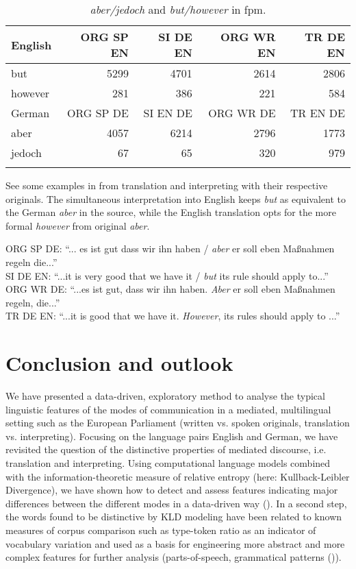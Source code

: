 \documentclass[output=paper,colorlinks,citecolor=brown]{langscibook}
\begin{document}
\begin{table}
\begin{tabular}{lrrrr}
\lsptoprule
English & ORG SP EN & SI DE EN & ORG WR EN & TR DE EN \\\midrule
but & 5299 & 4701 & 2614 & 2806 \\
however & 281 & 386 & 221 & 584 \\\midrule
German & ORG SP DE & SI EN DE & ORG WR DE & TR EN DE \\\midrule
aber & 4057 & 6214 & 2796 & 1773 \\
jedoch & 67 & 65 & 320 & 979\\
\lspbottomrule
\end{tabular}
\caption{\label{tab:con}\textit{aber/jedoch} and \textit{but/however} in fpm.}
\end{table}

See some examples in  from translation and interpreting with their respective originals. The simultaneous interpretation into English keeps \textit{but} as equivalent to the German \textit{aber} in the source, while the English translation opts for the more formal \textit{however} from original \textit{aber}. 

\ea \label{ex:przybyl:1}
    \ea ORG SP DE: “... es ist gut dass wir ihn haben / \textit{aber} er soll eben Maßnahmen regeln die...”\\
    \ex SI DE EN: “...it is very good that we have it / \textit{but} its rule should apply to...”\\
    \ex ORG WR DE: “...es ist gut, dass wir ihn haben. \textit{Aber} er soll eben Maßnahmen regeln, die...”\\
    TR DE EN: “...it is good that we have it. \textit{However}, its rules should apply to ...”
    \z
\z


\section{Conclusion and outlook}\label{conclusion} 
We have presented a data-driven, exploratory method to analyse the typical linguistic features of the modes of communication in a mediated, multilingual setting such as the European Parliament (written vs. spoken originals, translation vs. interpreting). Focusing on the language pairs English and German, we have revisited the question of the distinctive properties of mediated discourse, i.e. translation and interpreting. Using computational language models combined with the information-theoretic measure of relative entropy (here: Kullback-Leibler Divergence), we have shown how to detect and assess features indicating major differences between the different modes in a data-driven way (). 
In a second step, the words found to be distinctive by KLD modeling have been related to known measures of corpus comparison such as type-token ratio as an indicator of vocabulary variation and  used as a basis for engineering more abstract and more complex features for further analysis (parts-of-speech, grammatical  patterns ()).
\end{document}
